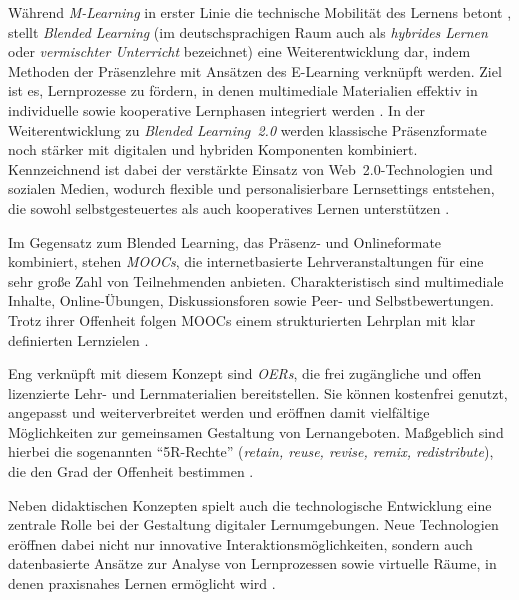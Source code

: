 Während \textit{M-Learning} in erster Linie die technische Mobilität des Lernens betont \parencites[S.~3f]{balaji_perspective_2016}[S.~197]{basak_kumar_e-learning_2018}, stellt \textit{Blended Learning} (im deutschsprachigen Raum auch als \textit{hybrides Lernen} oder \textit{vermischter Unterricht} bezeichnet) eine Weiterentwicklung dar, indem Methoden der Präsenzlehre mit Ansätzen des E-Learning verknüpft werden. Ziel ist es, Lernprozesse zu fördern, in denen multimediale Materialien effektiv in individuelle sowie kooperative Lernphasen integriert werden \parencites[S.~74]{magenheim_blended_2003}[S.~29]{pfeiffer_simulationsumgebungen_2008}. In der Weiterentwicklung zu \textit{Blended Learning~2.0} werden klassische Präsenzformate noch stärker mit digitalen und hybriden Komponenten kombiniert. Kennzeichnend ist dabei der verstärkte Einsatz von Web~2.0-Technologien und sozialen Medien, wodurch flexible und personalisierbare Lernsettings entstehen, die sowohl selbstgesteuertes als auch kooperatives Lernen unterstützen \parencites{seufert_schulleitertagung_2014}{news_aktuell_gmbh_e-learning_2025}.

Im Gegensatz zum Blended Learning, das Präsenz- und Onlineformate kombiniert, stehen \textit{\acp{MOOC}}, die internetbasierte Lehrveranstaltungen für eine sehr große Zahl von Teilnehmenden anbieten. Charakteristisch sind multimediale Inhalte, Online-Übungen, Diskussionsforen sowie Peer- und Selbstbewertungen. Trotz ihrer Offenheit folgen MOOCs einem strukturierten Lehrplan mit klar definierten Lernzielen \parencites[S.~5]{yuan_moocs_2013}[S.~204]{liyanagunawardena_moocs_2013}.

Eng verknüpft mit diesem Konzept sind \textit{\acp{OER}}, die frei zugängliche und offen lizenzierte Lehr- und Lernmaterialien bereitstellen. Sie können kostenfrei genutzt, angepasst und weiterverbreitet werden und eröffnen damit vielfältige Möglichkeiten zur gemeinsamen Gestaltung von Lernangeboten. Maßgeblich sind hierbei die sogenannten \enquote{5R-Rechte} (\textit{retain, reuse, revise, remix, redistribute}), die den Grad der Offenheit bestimmen \parencite[S.~134f]{wiley_defining_2018}.


Neben didaktischen Konzepten spielt auch die technologische Entwicklung eine zentrale Rolle bei der Gestaltung digitaler Lernumgebungen. Neue Technologien eröffnen dabei nicht nur innovative Interaktionsmöglichkeiten, sondern auch datenbasierte Ansätze zur Analyse von Lernprozessen sowie virtuelle Räume, in denen praxisnahes Lernen ermöglicht wird \parencite[S.1]{celik_technology_2024}.

